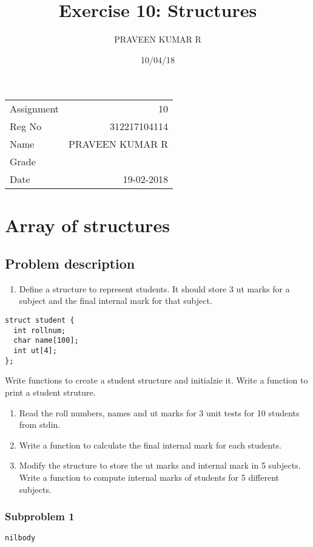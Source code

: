 \documentclass[11pt]{article}
\author{PRAVEEN KUMAR R}
\date{10/04/18}
\title{Exercise 10: Structures}
\begin{document}
\maketitle
\begin{export}
\linespread{1.2}
\end{export}
\begin{center}
\begin{tabular}{lr}
Assignment & 10\\
Reg No & 312217104114\\
Name & PRAVEEN KUMAR R\\
Grade & \\
Date & 19-02-2018\\
\end{tabular}
\end{center}


\section{Array of structures}
\label{sec-1}
\subsection{Problem description}
\label{sec-1-1}

\begin{enumerate}
\item Define a structure to represent students. It should store 3 ut marks for a subject and
the final internal mark for that subject.
\end{enumerate}
\begin{verbatim}
struct student {
  int rollnum;
  char name[100];
  int ut[4];
};
\end{verbatim}

Write functions to create a student structure and initialzie it. Write a function to print
a student struture.
\begin{enumerate}
\item Read the roll numbers, names and ut marks for 3 unit tests for 10 students from stdin.
\item Write a function to calculate the final internal mark for each students.
\item Modify the structure to store the ut marks and internal mark in 5 subjects. Write a
function to compute internal marks of students for 5 different subjects.
\end{enumerate}
\subsubsection{Subproblem 1}
\label{sec-1-1-1}
\begin{verbatim}
nilbody
\end{verbatim}
\end{document}
